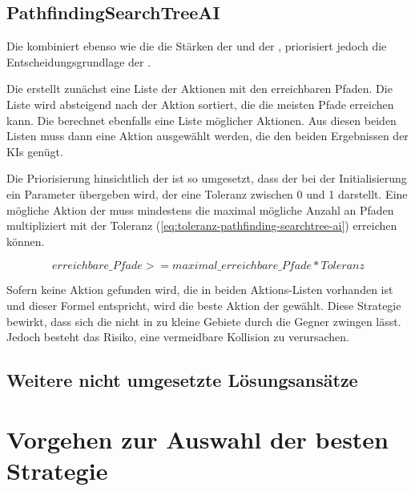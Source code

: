 \subsection{PathfindingSearchTreeAI}
\label{subsec:pathfinding-searchtree-ai}

Die  kombiniert ebenso wie die  die Stärken der
 und der , priorisiert jedoch die Entscheidungsgrundlage der
.

Die  erstellt zunächst eine Liste der Aktionen mit den erreichbaren Pfaden.
Die Liste wird absteigend nach der Aktion sortiert, die die meisten Pfade erreichen kann.
Die  berechnet ebenfalls eine Liste möglicher Aktionen.
Aus diesen beiden Listen muss dann eine Aktion ausgewählt werden, die den beiden Ergebnissen der \ac{KI}s genügt.

Die Priorisierung hinsichtlich der  ist so umgesetzt, dass der  bei
der Initialisierung ein Parameter übergeben wird, der eine Toleranz zwischen 0 und 1 darstellt.
Eine mögliche Aktion der  muss mindestens die maximal mögliche Anzahl an Pfaden multipliziert mit der
Toleranz (\ref{eq:toleranz-pathfinding-searchtree-ai}) erreichen können.

\begin{equation}
\label{eq:toleranz-pathfinding-searchtree-ai}
erreichbare\_Pfade >= maximal\_erreichbare\_Pfade * Toleranz
\end{equation}

Sofern keine Aktion gefunden wird, die in beiden Aktions-Listen vorhanden ist und dieser Formel entspricht, wird die
beste Aktion der  gewählt.
Diese Strategie bewirkt, dass sich die  nicht in zu kleine Gebiete durch die Gegner
zwingen lässt. Jedoch besteht das Risiko, eine vermeidbare Kollision zu verursachen.

\subsection{Weitere nicht umgesetzte Lösungsansätze}
\label{subsec:weitere-loesungsansaetze}


\section{Vorgehen zur Auswahl der besten Strategie}
\label{sec:vorgehen-strategieauswahl}

